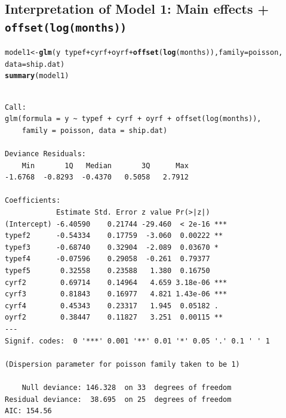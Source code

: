 \documentclass{article}\usepackage[]{graphicx}\usepackage[svgnames]{xcolor}
\makeatletter
\newcommand{\hlopt}[1]{\textcolor[rgb]{0,0,0}{#1}}%
\newcommand{\hlstd}[1]{\textcolor[rgb]{0.345,0.345,0.345}{#1}}%
\newcommand{\hlkwb}[1]{\textcolor[rgb]{0.69,0.353,0.396}{#1}}%
\newcommand{\hlkwc}[1]{\textcolor[rgb]{0.333,0.667,0.333}{#1}}%
\newcommand{\hlkwd}[1]{\textcolor[rgb]{0.737,0.353,0.396}{\textbf{#1}}}%
\newenvironment{kframe}{%
 \def\at@end@of@kframe{}%
 \ifinner\ifhmode%
  \def\at@end@of@kframe{\end{minipage}}%
  \begin{minipage}{\columnwidth}%
 \fi\fi%
 \def\FrameCommand##1{\hskip\@totalleftmargin \hskip-\fboxsep
 \colorbox{shadecolor}{##1}\hskip-\fboxsep
     \hskip-\linewidth \hskip-\@totalleftmargin \hskip\columnwidth}%
 \MakeFramed {\advance\hsize-\width
   \@totalleftmargin\z@ \linewidth\hsize
   \@setminipage}}%
 {\par\unskip\endMakeFramed%
 \at@end@of@kframe}
\newenvironment{knitrout}{}{} %
\makeatother
\begin{document}
\subsection*{Interpretation of Model 1: Main effects + \texttt{offset(log(months))}}
\begin{knitrout}
\color{fgcolor}\begin{kframe}
\begin{alltt}
\hlstd{model1} \hlkwb{<-} \hlkwd{glm}\hlstd{(y} \hlopt{~} \hlstd{typef} \hlopt{+} \hlstd{cyrf} \hlopt{+} \hlstd{oyrf} \hlopt{+} \hlkwd{offset}\hlstd{(}\hlkwd{log}\hlstd{(months)),} \hlkwc{family} \hlstd{= poisson,}
  \hlkwc{data} \hlstd{= ship.dat)}
\hlkwd{summary}\hlstd{(model1)}
\end{alltt}
\begin{verbatim}

Call:
glm(formula = y ~ typef + cyrf + oyrf + offset(log(months)), 
    family = poisson, data = ship.dat)

Deviance Residuals: 
    Min       1Q   Median       3Q      Max  
-1.6768  -0.8293  -0.4370   0.5058   2.7912  

Coefficients:
            Estimate Std. Error z value Pr(>|z|)    
(Intercept) -6.40590    0.21744 -29.460  < 2e-16 ***
typef2      -0.54334    0.17759  -3.060  0.00222 ** 
typef3      -0.68740    0.32904  -2.089  0.03670 *  
typef4      -0.07596    0.29058  -0.261  0.79377    
typef5       0.32558    0.23588   1.380  0.16750    
cyrf2        0.69714    0.14964   4.659 3.18e-06 ***
cyrf3        0.81843    0.16977   4.821 1.43e-06 ***
cyrf4        0.45343    0.23317   1.945  0.05182 .  
oyrf2        0.38447    0.11827   3.251  0.00115 ** 
---
Signif. codes:  0 '***' 0.001 '**' 0.01 '*' 0.05 '.' 0.1 ' ' 1

(Dispersion parameter for poisson family taken to be 1)

    Null deviance: 146.328  on 33  degrees of freedom
Residual deviance:  38.695  on 25  degrees of freedom
AIC: 154.56


\end{verbatim}
\end{kframe}
\end{knitrout}
\end{document}
